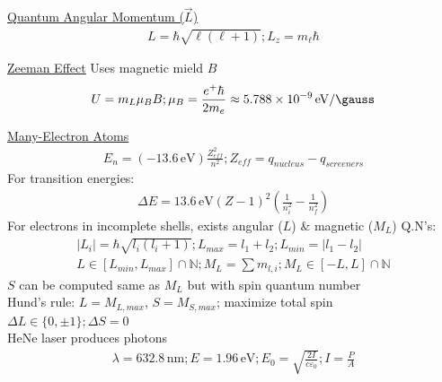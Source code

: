 \documentclass[8pt]{extarticle}
\newcommand{\E}[1]{\times 10^{#1}}
\begin{document}
    \underline{Quantum Angular Momentum ($\vec{L}$)}
        \begin{gather*}
            L = \hbar \sqrt{\ell(\ell + 1)};
            L_z = m_\ell \hbar
        \end{gather*}

    \underline{Zeeman Effect}
        Uses magnetic mield $B$
        \begin{gather*}
            U = m_L \mu_B B;
            \mu_B = \frac{e^+ \hbar}{2m_e} \approx 5.788\E{-9}\,\unit{\eV/\gauss}
        \end{gather*}

    \underline{Many-Electron Atoms}
        \begin{gather*}
            E_n = (-13.6\,\unit{\eV})\frac{Z_{eff}^2}{n^2};
            Z_{eff} = q_{nucleus} - q_{screeners}
        \end{gather*}
        For transition energies:
        \begin{gather*}
            \Delta E = 13.6\,\unit{\eV}(Z - 1)^2\left( \frac{1}{n_i^2} - \frac{1}{n_f^2} \right)
        \end{gather*}
        For electrons in incomplete shells, exists angular ($L$) \& magnetic ($M_L$) Q.N's:
        \begin{gather*}
            |L_i| = \hbar\sqrt{l_i(l_i + 1)};
            L_{max} = l_1 + l_2; 
            L_{min} = |l_1 - l_2|\\
            L \in [L_{min}, L_{max}] \cap \mathbb{N};
            M_L = \sum m_{l,i};
            M_L \in [-L, L] \cap \mathbb{N}
        \end{gather*}
        $S$ can be computed same as $M_L$ but with spin quantum number\\
        Hund's rule: $L = M_{L, max}$, $S = M_{S, max}$; maximize total spin\\
        $\Delta L \in \{0, \pm 1\}; \Delta S = 0$\\
        HeNe laser produces photons
        \begin{gather*}
            \lambda = 632.8\,\unit{\nano\meter}; E = 1.96\,\unit{\eV};
            E_0 = \sqrt{\frac{2I}{c\varepsilon_0}}; I = \frac{P}{A}
        \end{gather*} 
\end{document}
